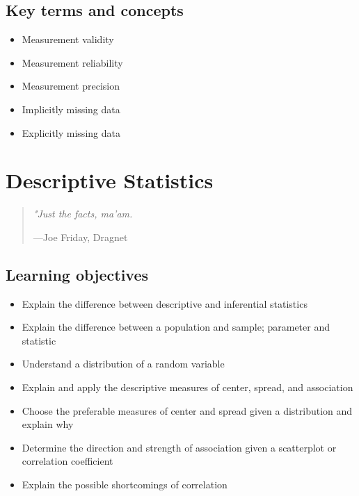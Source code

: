 \documentclass[
]{book}
\providecommand{\tightlist}{%
  \setlength{\itemsep}{0pt}\setlength{\parskip}{0pt}}
\begin{document}
\hypertarget{kt2}{%
\section{Key terms and concepts}\label{kt2}}

\begin{itemize}
\tightlist
\item
  Measurement validity
\item
  Measurement reliability
\item
  Measurement precision
\item
  Implicitly missing data
\item
  Explicitly missing data
\end{itemize}

\hypertarget{descriptive-statistics}{%
\chapter{Descriptive Statistics}\label{descriptive-statistics}}

\begin{quote}
\emph{"Just the facts, ma'am.}

---Joe Friday, Dragnet
\end{quote}

\hypertarget{lo4}{%
\section{Learning objectives}\label{lo4}}

\begin{itemize}
\tightlist
\item
  Explain the difference between descriptive and inferential statistics
\item
  Explain the difference between a population and sample; parameter and statistic
\item
  Understand a distribution of a random variable
\item
  Explain and apply the descriptive measures of center, spread, and association
\item
  Choose the preferable measures of center and spread given a distribution and explain why
\item
  Determine the direction and strength of association given a scatterplot or correlation coefficient
\item
  Explain the possible shortcomings of correlation
\end{itemize}
\end{document}
